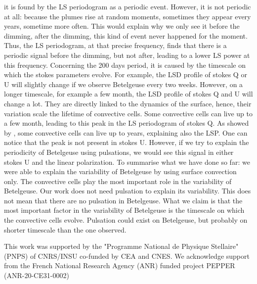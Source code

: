 \documentclass{aa}
\begin{document}
it is found by the LS periodogram as a periodic event. However, it is not periodic at all: because the plumes rise at random moments, sometimes they 
appear every years, sometime more often. This would explain why we only see it before the dimming, after the dimming, this kind of event never happened 
for the moment. Thus, the LS periodogram, at that precise frequency, finds that there is a periodic signal before the dimming, but not after, leading to
a lower LS power at this frequency. Concerning the 200 days period, it is caused by the timescale on which the stokes parameters evolve. For example, the 
LSD profile of stokes Q or U will slightly change if we observe Betelgeuse every two weeks. However, on a longer timescale, for example a few month, 
the LSD profile of stokes Q and U will change a lot. They are directly linked to the dynamics of the surface, hence,  their variation scale the lifetime 
of convective cells. Some convective cells can live up to a few month, leading to this peak in the LS periodogram of stokes Q. As showed by
\cite{LopezAriste2018}, some convective cells can live up to years, explaining also the LSP. One can notice that the peak is not present in stokes U. 
However, if we try to explain the periodicity of Betelgeuse using pulsations, we would see this signal in either stokes U and the linear polarization. 
To summarise what we have done so far: we were able to explain the variability of Betelgeuse by using surface convection only. The convective cells play 
the most important role in the variability of Betelgeuse. Our work does not need pulsation to explain its variability. This does not mean that there are 
no pulsation in Betelgeuse. What we claim is that the most important factor in the variability of Betelgeuse is the timescale on which the convective 
cells evolve. Pulsation could exist on Betelgeuse, but probably on shorter timescale than the one observed. 

\begin{acknowledgements}
    This work was supported by the "Programme National de Physique Stellaire" (PNPS) of CNRS/INSU co-funded by CEA and CNES.
    We acknowledge support from the French National Research Agency (ANR)
    funded project PEPPER (ANR-20-CE31-0002)
    \end{acknowledgements}
    
    
    
    
\end{document}
